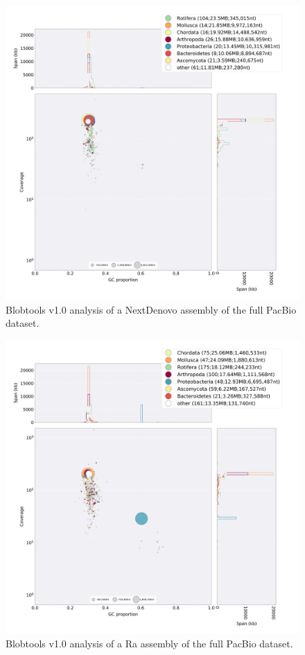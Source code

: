 \begin{suppsection}
  \begin{figure}[ht]
    \centering
     \includegraphics[width=15cm]{fig/benchmark/PB_ND.png}
   \caption{Blobtools v1.0 analysis of a NextDenovo assembly of the full PacBio dataset.}
   \label{fig:blobtools_NextDenovo_pb}
 \end{figure}

 \begin{figure}[ht]
    \centering
     \includegraphics[width=15cm]{fig/benchmark/PB_RA.png}
   \caption{Blobtools v1.0 analysis of a Ra assembly of the full PacBio dataset.}
   \label{fig:blobtools_ra_pb}
 \end{figure}
 

\end{suppsection}
